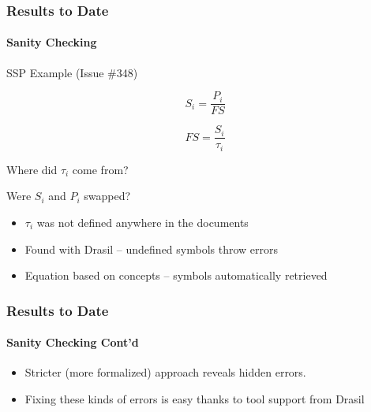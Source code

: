 \documentclass{beamer}
\begin{document}

\begin{frame}[fragile]

\frametitle{Results to Date} %
\framesubtitle{Sanity Checking}

SSP Example (Issue \#348)

\begin{minipage}{.4\linewidth}
\begin{equation*}
S_i = \frac{P_i}{FS}
\end{equation*}
\end{minipage}%
\begin{minipage}{.4\linewidth}
\begin{equation*}
FS = \frac{S_i}{\tau{}_i}
\end{equation*}
\end{minipage}

\vspace{.5cm}Where did $\tau{}_i$ come from?\vspace{.3cm}

Were $S_i$ and $P_i$ swapped?


\begin{itemize}
\item $\tau{}_i$ was not defined anywhere in the documents
\item Found with Drasil -- undefined symbols throw errors
\item Equation based on concepts -- symbols automatically retrieved
\end{itemize}


\end{frame}


\begin{frame}[fragile]

\frametitle{Results to Date} %
\framesubtitle{Sanity Checking Cont'd}

\begin{itemize}
\item Stricter (more formalized) approach reveals hidden errors.

\item Fixing these kinds of errors is easy thanks to tool support from Drasil
\end{itemize}

\end{frame}
\end{document}
